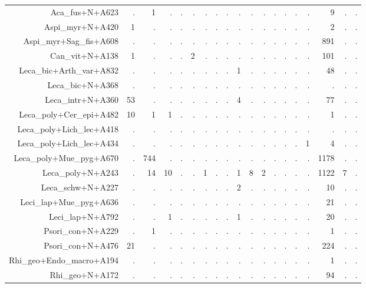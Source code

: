 \documentclass[a4paper, 11]{article}\usepackage[]{graphicx}\usepackage[]{color}
\begin{document}
\begin{table}
\begin{tabular}{rrrrrrrrrrrrrrrrrrr}
  \hline
Aca\_fus+N+A623 & . & 1 & . & . & . & . & . & . & . & . & . & . & . & . & . & 9 & . & . \\ 
  Aspi\_myr+N+A420 & 1 & . & . & . & . & . & . & . & . & . & . & . & . & . & . & 2 & . & . \\ 
  Aspi\_myr+Sag\_fis+A608 & . & . & . & . & . & . & . & . & . & . & . & . & . & . & . & 891 & . & . \\ 
  Can\_vit+N+A138 & 1 & . & . & . & 2 & . & . & . & . & . & . & . & . & . & . & 101 & . & . \\ 
  Leca\_bic+Arth\_var+A832 & . & . & . & . & . & . & . & . & 1 & . & . & . & . & . & . & 48 & . & . \\ 
  Leca\_bic+N+A368 & . & . & . & . & . & . & . & . & . & . & . & . & . & . & . & . & . & . \\ 
  Leca\_intr+N+A360 & 53 & . & . & . & . & . & . & . & 4 & . & . & . & . & . & . & 77 & . & . \\ 
  Leca\_poly+Cer\_epi+A482 & 10 & 1 & 1 & . & . & . & . & . & . & . & . & . & . & . & . & 1 & . & . \\ 
  Leca\_poly+Lich\_lec+A418 & . & . & . & . & . & . & . & . & . & . & . & . & . & . & . & . & . & . \\ 
  Leca\_poly+Lich\_lec+A434 & . & . & . & . & . & . & . & . & . & . & . & . & . & . & 1 & 4 & . & . \\ 
  Leca\_poly+Mue\_pyg+A670 & . & 744 & . & . & . & . & . & . & . & . & . & . & . & . & . & 1178 & . & . \\ 
  Leca\_poly+N+A243 & . & 14 & 10 & . & . & 1 & . & . & 1 & 8 & 2 & . & . & . & . & 1122 & 7 & . \\ 
  Leca\_schw+N+A227 & . & . & . & . & . & . & . & . & 2 & . & . & . & . & . & . & 10 & . & . \\ 
  Leci\_lap+Mue\_pyg+A636 & . & . & . & . & . & . & . & . & . & . & . & . & . & . & . & 21 & . & . \\ 
  Leci\_lap+N+A792 & . & . & 1 & . & . & . & . & . & 1 & . & . & . & . & . & . & 20 & . & . \\ 
  Psori\_con+N+A229 & . & 1 & . & . & . & . & . & . & . & . & . & . & . & . & . & 1 & . & . \\ 
  Psori\_con+N+A476 & 21 & . & . & . & . & . & . & . & . & . & . & . & . & . & . & 224 & . & . \\ 
  Rhi\_geo+Endo\_macro+A194 & . & . & . & . & . & . & . & . & . & . & . & . & . & . & . & 1 & . & . \\ 
  Rhi\_geo+N+A172 & . & . & . & . & . & . & . & . & . & . & . & . & . & . & . & 94 & . & . \\ 

\end{tabular}
\end{table}
\end{document}
